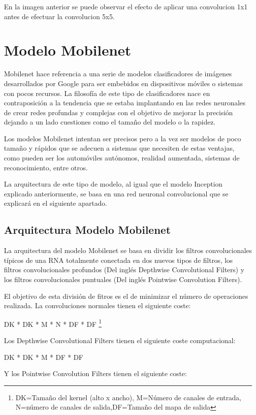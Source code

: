 En la imagen anterior se puede observar el efecto de aplicar una convolucion 1x1 antes de efectuar la convolucion 5x5.

\section{Modelo Mobilenet}

Mobilenet hace referencia a una serie de modelos clasificadores de imágenes desarrollados por Google para ser embebidos en dispositivos móviles o sistemas con pocos recursos. La filosofía de este tipo de clasificadores nace en contraposición a la tendencia que se estaba implantando en las redes neuronales de crear redes profundas y complejas con el objetivo de mejorar la precisión dejando a un lado cuestiones como el tamaño del modelo o la rapidez. 

Los modelos Mobilenet intentan ser precisos pero a la vez ser modelos de poco tamaño y rápidos que se adecuen a sistemas que necesiten de estas ventajas, como pueden ser los automóviles autónomos, realidad aumentada, sistemas de reconocimiento, entre otros.

La arquitectura de este tipo de modelo, al igual que el modelo Inception explicado anteriormente, se basa en una red neuronal convolucional que se explicará en el siguiente apartado.

\subsection{Arquitectura Modelo Mobilenet}

La arquitectura del modelo Mobilenet se basa en dividir los filtros convolucionales típicos de una RNA totalmente conectada en dos nuevos tipos de filtros, los filtros convolucionales profundos (Del inglés Depthwise Convolutional Filters) y los filtros convolucionales puntuales (Del inglés Pointwise Convolution Filters).

El objetivo de esta división de fitros es el de minimizar el número de operaciones realizada. La convoluciones normales tienen el siguiente coste:

DK * DK * M * N * DF * DF \footnote{DK=Tamaño del kernel (alto x ancho), M=Número de canales de entrada, N=número de canales de salida,DF=Tamaño del mapa de salida}

Los Depthwise Convolutional Filters tienen el siguiente coste computacional:

DK * DK * M * DF * DF

Y los Pointwise Convolution Filters tienen el siguiente coste:

